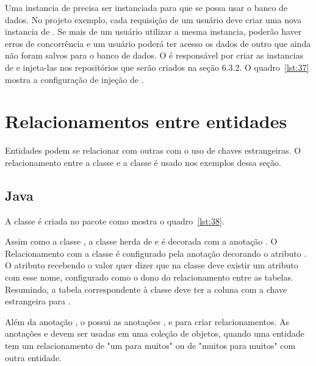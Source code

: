 Uma instancia de  precisa ser instanciada para que se possa usar o banco de dados. No projeto exemplo, cada requisição de um usuário deve criar uma nova instancia de . Se mais de um usuário utilizar a mesma instancia, poderão haver erros de concorrência e um usuário poderá ter acesso os dados de outro que ainda não foram salvos para o banco de dados. O  é responsável por criar as instancias de  e injeta-las nos repositórios que serão criados na seção 6.3.2. O quadro~\ref{lst:37} mostra a configuração de injeção de .


\section{Relacionamentos entre entidades}

Entidades podem se relacionar com outras com o uso de chaves estrangeiras. O relacionamento entre a classe  e a classe  é usado nos exemplos dessa seção.

\subsection{Java}

A classe  é criada no pacote  como mostra o quadro~\ref{lst:38}.


Assim como a classe , a classe  herda de  e é decorada com a anotação . O Relacionamento com a classe  é configurado pela anotação  decorando o atributo . O atributo  recebendo o valor  quer dizer que na classe  deve existir um atributo com esse nome, configurado como o dono do relacionamento entre as tabelas. Resumindo, a tabela correspondente à classe  deve ter a coluna com a chave estrangeira para .

Além da anotação , o  possui as anotações ,  e  para criar relacionamentos. As anotações  e  devem ser usadas em uma coleção de objetos, quando uma entidade tem um relacionamento de "um para muitos" ou de "muitos para muitos" com outra entidade.

